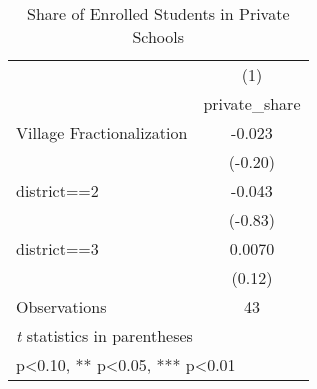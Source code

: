 \begin{table}[htbp]\centering
\def\sym#1{\ifmmode^{#1}\else\(^{#1}\)\fi}
\caption{Share of Enrolled Students in Private Schools \label{privateshare}}
\begin{tabular}{l*{1}{c}}
\toprule
                &\multicolumn{1}{c}{(1)}\\
                &\multicolumn{1}{c}{private\_share}\\
\midrule
Village Fractionalization&   -0.023   \\
                &  (-0.20)   \\
district==2     &   -0.043   \\
                &  (-0.83)   \\
district==3     &   0.0070   \\
                &   (0.12)   \\
\midrule
Observations    &       43   \\
\bottomrule
\multicolumn{2}{l}{\footnotesize \textit{t} statistics in parentheses}\\
\multicolumn{2}{l}{\footnotesize * p<0.10, ** p<0.05, *** p<0.01}\\
\end{tabular}
\end{table}
